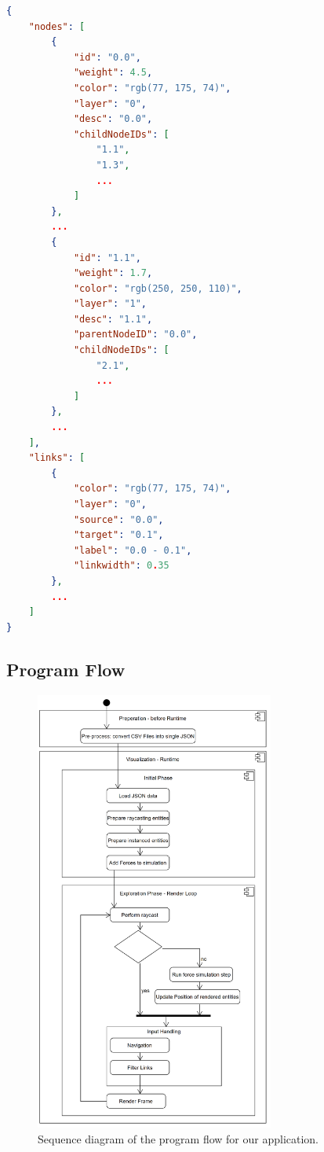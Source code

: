 \begin{lstlisting}[language=json,label={lst:internalJSON},caption=minimal JSON input data structure]
{
    "nodes": [
        {
            "id": "0.0",
            "weight": 4.5,
            "color": "rgb(77, 175, 74)",
            "layer": "0",
            "desc": "0.0",
            "childNodeIDs": [
                "1.1",
                "1.3",
                ...
            ]
        },
        ...
        {
            "id": "1.1",
            "weight": 1.7,
            "color": "rgb(250, 250, 110)",
            "layer": "1",
            "desc": "1.1",
            "parentNodeID": "0.0",
            "childNodeIDs": [
                "2.1",
                ...
            ]
        },
        ...
    ],
    "links": [
        {
            "color": "rgb(77, 175, 74)",
            "layer": "0",
            "source": "0.0",
            "target": "0.1",
            "label": "0.0 - 0.1",
            "linkwidth": 0.35
        },
        ...
    ]
}
\end{lstlisting}

\subsection{Program Flow}
\label{section:programFlow}
\begin{figure}[!hbt]
    \centering
    \includegraphics[width=0.70\textwidth]{graphics/vrgraph_flow.png}
    \caption{Sequence diagram of the program flow for our application.}
    \label{fig:impl_programFlow}
\end{figure}

